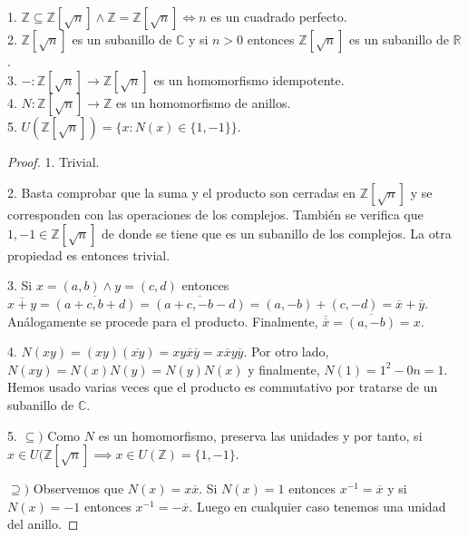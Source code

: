 \begin{proposition}
1. $\mathbb{Z} \subseteq \mathbb{Z}[\sqrt{n}] \land \mathbb{Z} = \mathbb{Z}[\sqrt{n}] \iff n$ es un cuadrado perfecto. \\
2. $\mathbb{Z}[\sqrt{n}]$ es un subanillo de $\mathbb{C}$ y si $n > 0$ entonces $\mathbb{Z}[\sqrt{n}]$ es un subanillo de $\mathbb{R}$. \\
3. $-:\mathbb{Z}[\sqrt{n}] \to \mathbb{Z}[\sqrt{n}]$ es un homomorfismo idempotente.\\
4. $N:\mathbb{Z}[\sqrt{n}] \to \mathbb{Z}$ es un homomorfismo de anillos.\\
5. $U(\mathbb{Z}[\sqrt{n}]) = \{x: N(x) \in \{1, -1\}\}$. 
\end{proposition}
\begin{proof}
1. Trivial.

2. Basta comprobar que la suma y el producto son cerradas en $\mathbb{Z}[\sqrt{n}]$ y se corresponden con las operaciones de los complejos. También se verifica que $1,-1 \in \mathbb{Z}[\sqrt{n}]$ de donde se tiene que es un subanillo de los complejos. La otra propiedad es entonces trivial. 

3. Si $x = (a,b) \land y = (c,d)$ entonces $\overline{x+y} = \overline{(a+c,b+d)} = \overline{(a+c,-b-d)} = (a,-b) + (c,-d) = \overline{x} + \overline{y}$. Análogamente se procede para el producto. Finalmente, $\overline{\overline{x}} = \overline{(a,-b)} = x$. 

4. $N(xy) = (xy)(\overline{xy}) = xy\overline{x}\overline{y} = x \overline{x} y \overline{y}$. Por otro lado, $N(xy) = N(x)N(y) = N(y)N(x)$ y finalmente, $N(1) = 1^2-0n = 1$. Hemos usado varias veces que el producto es commutativo por tratarse de un subanillo de $\mathbb{C}$. 

5. $\subseteq)$ Como $N$ es un homomorfismo, preserva las unidades y por tanto, si $x \in U(\mathbb{Z}[\sqrt{n}] \implies x \in U(\mathbb{Z}) = \{1,-1\}$.

$\supseteq)$ Observemos que $N(x) = x\overline{x}$. Si $N(x) = 1$ entonces $x^{-1} = \overline{x}$ y si $N(x) = -1$ entonces  $x^{-1} = - \overline{x}$. Luego en cualquier caso tenemos una unidad del anillo.  
\end{proof}

